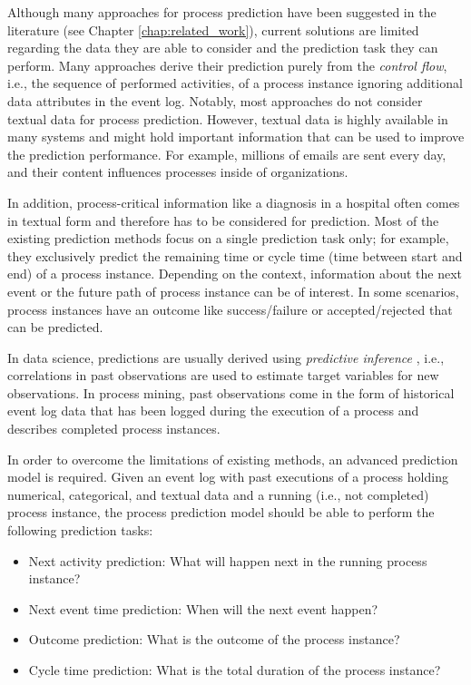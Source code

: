 Although many approaches for process prediction have been suggested in the literature (see Chapter \ref{chap:related_work}), current solutions are limited regarding the data they are able to consider and the prediction task they can perform.
Many approaches derive their prediction purely from the \textit{control flow}, i.e., the sequence of performed activities, of a process instance ignoring additional data attributes in the event log.
Notably, most approaches do not consider textual data for process prediction.
However, textual data is highly available in many systems and might hold important information that can be used to improve the prediction performance.
For example, millions of emails are sent every day, and their content influences processes inside of organizations.

In addition, process-critical information like a diagnosis in a hospital often comes in textual form and therefore has to be considered for prediction.
Most of the existing prediction methods focus on a single prediction task only; for example, they exclusively predict the remaining time or cycle time (time between start and end) of a process instance.
Depending on the context, information about the next event or the future path of process instance can be of interest.
In some scenarios, process instances have an outcome like success/failure or accepted/rejected that can be predicted.

In data science, predictions are usually derived using \textit{predictive inference} \cite{predinf}, i.e., correlations in past observations are used to estimate target variables for new observations.
In process mining, past observations come in the form of historical event log data that has been logged during the execution of a process and describes completed process instances.

In order to overcome the limitations of existing methods, an advanced prediction model is required.
Given an event log with past executions of a process holding numerical, categorical, and textual data and a running (i.e., not completed) process instance, the process prediction model should be able to perform the following prediction tasks:

\begin{itemize}
	\item Next activity prediction: What will happen next in the running process instance?
	\item Next event time prediction: When will the next event happen?
	\item Outcome prediction: What is the outcome of the process instance?
	\item Cycle time prediction: What is the total duration of the process instance?
\end{itemize}

